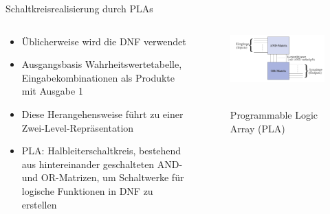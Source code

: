\documentclass[12pt%
,xcolor=table
,aspectratio=169%
]{beamer}
\begin{document}
\begin{frame}{Schaltkreisrealisierung durch PLAs}
\begin{columns}[T] %
\begin{column}{.6\textwidth}
\begin{itemize}
	\item Üblicherweise wird die DNF verwendet
	\item Ausgangsbasis Wahrheitswertetabelle, Eingabekombinationen als Produkte mit Ausgabe 1
	\item Diese Herangehensweise führt zu einer Zwei-Level-Repräsentation
	\item PLA: Halbleiterschaltkreis, bestehend aus hintereinander geschalteten AND- und OR-Matrizen, um Schaltwerke für logische Funktionen in DNF zu erstellen
\end{itemize}
\end{column}%
\hfill%
\begin{column}{.48\textwidth}
\centering
\begin{figure}
\includegraphics[scale=0.275]{pictures/pla}\
\caption{Programmable Logic Array (PLA)}
\end{figure}
\end{column}%
\end{columns}
\end{frame}
\end{document}
